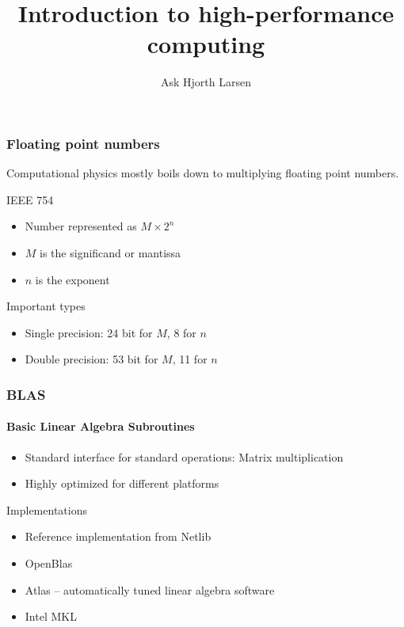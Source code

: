 \documentclass{beamer}
\author{Ask Hjorth Larsen}
\begin{document}
\title{Introduction to high-performance computing}

\begin{frame}
  \maketitle
\end{frame}

\begin{frame}
  \frametitle{Floating point numbers}
  Computational physics mostly boils down to multiplying floating point numbers.
  \begin{block}{IEEE 754}
    \begin{itemize}
    \item Number represented as $M \times 2^n$
    \item $M$ is the significand or mantissa
    \item $n$ is the exponent
    \end{itemize}
  \end{block}
  \begin{block}{Important types}
    \begin{itemize}
    \item Single precision: 24 bit for $M$, 8 for $n$
    \item Double precision: 53 bit for $M$, 11 for $n$
    \end{itemize}
  \end{block}
\end{frame}


\begin{frame}
  \frametitle{BLAS}
  \framesubtitle{Basic Linear Algebra Subroutines}
  \begin{itemize}
  \item Standard interface for standard operations:
    Matrix multiplication
  \item Highly optimized for different platforms
  \end{itemize}
  \begin{block}{Implementations}
    \begin{itemize}
    \item Reference implementation from Netlib
    \item OpenBlas
    \item Atlas -- automatically tuned linear algebra software
    \item Intel MKL
    \end{itemize}
  \end{block}
\end{frame}
\end{document}
